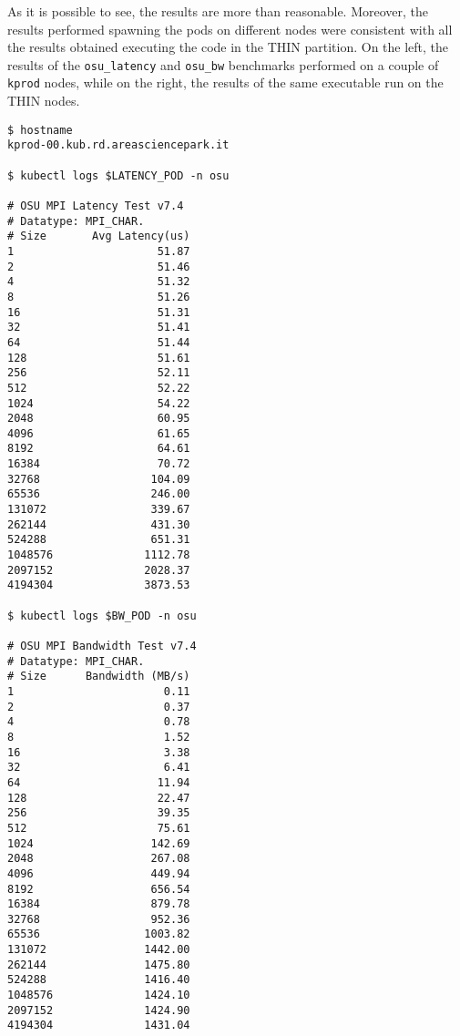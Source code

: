 As it is possible to see, the results are more than reasonable.
Moreover, the results performed spawning the pods on different nodes were
consistent with all the results obtained executing the code in the THIN
partition.
On the left, the results of the \texttt{osu\_latency} and \texttt{osu\_bw}
benchmarks performed on a couple of \texttt{kprod} nodes, while on the right,
the results of the same executable run on the THIN nodes.


\begin{minipage}[t]{0.48\textwidth}
\begin{verbatim}
$ hostname
kprod-00.kub.rd.areasciencepark.it

$ kubectl logs $LATENCY_POD -n osu

# OSU MPI Latency Test v7.4
# Datatype: MPI_CHAR.
# Size       Avg Latency(us)
1                      51.87
2                      51.46
4                      51.32
8                      51.26
16                     51.31
32                     51.41
64                     51.44
128                    51.61
256                    52.11
512                    52.22
1024                   54.22
2048                   60.95
4096                   61.65
8192                   64.61
16384                  70.72
32768                 104.09
65536                 246.00
131072                339.67
262144                431.30
524288                651.31
1048576              1112.78
2097152              2028.37
4194304              3873.53

$ kubectl logs $BW_POD -n osu

# OSU MPI Bandwidth Test v7.4
# Datatype: MPI_CHAR.
# Size      Bandwidth (MB/s)
1                       0.11
2                       0.37
4                       0.78
8                       1.52
16                      3.38
32                      6.41
64                     11.94
128                    22.47
256                    39.35
512                    75.61
1024                  142.69
2048                  267.08
4096                  449.94
8192                  656.54
16384                 879.78
32768                 952.36
65536                1003.82
131072               1442.00
262144               1475.80
524288               1416.40
1048576              1424.10
2097152              1424.90
4194304              1431.04
\end{verbatim}
\end{minipage}
\hfill
